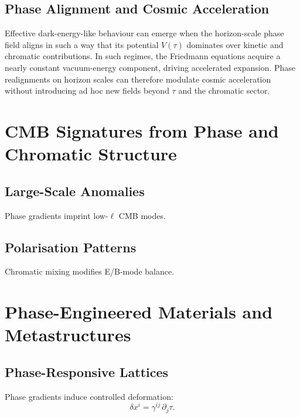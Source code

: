 \section{Phase Alignment and Cosmic Acceleration}

Effective dark-energy-like behaviour can emerge when the horizon-scale phase field aligns in such a way that its potential $V(\tau)$ dominates over kinetic and chromatic contributions.
In such regimes, the Friedmann equations acquire a nearly constant vacuum-energy component, driving accelerated expansion.
Phase realignments on horizon scales can therefore modulate cosmic acceleration without introducing ad hoc new fields beyond $\tau$ and the chromatic sector.


\chapter{CMB Signatures from Phase and Chromatic Structure}

\section{Large-Scale Anomalies}
Phase gradients imprint low-\(\ell\) CMB modes.

\section{Polarisation Patterns}
Chromatic mixing modifies E/B-mode balance.


\chapter{Phase-Engineered Materials and Metastructures}

\section{Phase-Responsive Lattices}
Phase gradients induce controlled deformation:
\[
\delta x^i = \gamma^{ij}\,\partial_j \tau.
\]

